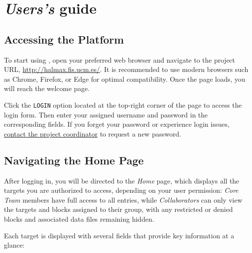 
\part{\textsl{Users's} guide} \label{part:user}

    
\chapter{Accessing the Platform} \label{chap:user-access}

To start using \project, open your preferred web browser and navigate to the project URL, \url{http://halmax.fis.ucm.es/}. It is recommended to use modern browsers such as Chrome, Firefox, or Edge for optimal compatibility. Once the page loads, you will reach the welcome page. 


Click the \texttt{LOGIN} option located at the top-right corner of the page to access the login form. Then enter your assigned username and password in the corresponding fields. If you forget your password or experience login issues, \href{mailto:\prjMail}{contact the project coordinator} to request a new password.



\chapter{Navigating the Home Page} \label{chap:user-homepage}

After logging in, you will be directed to the \textsl{Home} page, which displays all the targets you are authorized to access, depending on your user permission: \textsl{Core Team} members have full access to all entries, while \textsl{Collaborators} can only view the targets and blocks assigned to their group, with any restricted or denied blocks and associated data files remaining hidden.

\addimage

Each target is displayed with several fields that provide key information at a glance:

